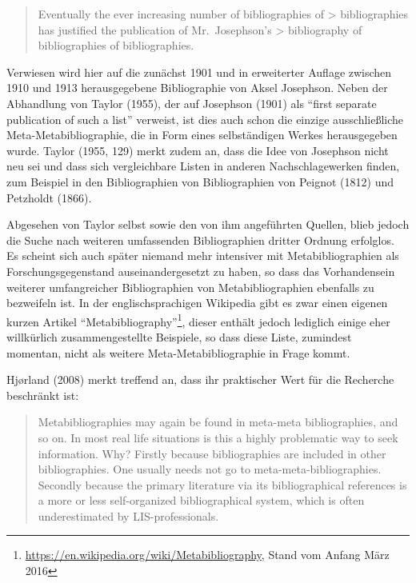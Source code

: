\documentclass[a4paper,
fontsize=11pt,
oneside,
numbers=noperiodatend,
parskip=half-,
bibliography=totoc,
final
]{scrartcl}
\begin{document}
\begin{quote}
Eventually the ever increasing number of bibliographies of
\textgreater{} bibliographies has justified the publication of
Mr.~Josephson's \textgreater{} bibliography of bibliographies of
bibliographies.
\end{quote}

Verwiesen wird hier auf die zunächst 1901 und in erweiterter Auflage
zwischen 1910 und 1913 herausgegebene Bibliographie von Aksel Josephson.
Neben der Abhandlung von Taylor (1955), der auf Josephson (1901) als
\enquote{first separate publication of such a list} verweist, ist dies
auch schon die einzige ausschließliche Meta-Metabibliographie, die in
Form eines selbständigen Werkes herausgegeben wurde. Taylor (1955, 129)
merkt zudem an, dass die Idee von Josephson nicht neu sei und dass sich
vergleichbare Listen in anderen Nachschlagewerken finden, zum Beispiel
in den Bibliographien von Bibliographien von Peignot (1812) und
Petzholdt (1866).

Abgesehen von Taylor selbst sowie den von ihm angeführten Quellen, blieb
jedoch die Suche nach weiteren umfassenden Bibliographien dritter
Ordnung erfolglos. Es scheint sich auch später niemand mehr intensiver
mit Metabibliographien als Forschungsgegenstand auseinandergesetzt zu
haben, so dass das Vorhandensein weiterer umfangreicher Bibliographien
von Metabibliographien ebenfalls zu bezweifeln ist. In der
englischsprachigen Wikipedia gibt es zwar einen eigenen kurzen Artikel
\enquote{Metabibliography}\footnote{\url{https://en.wikipedia.org/wiki/Metabibliography},
  Stand vom Anfang März 2016}, dieser enthält jedoch lediglich einige
eher willkürlich zusammengestellte Beispiele, so dass diese Liste,
zumindest momentan, nicht als weitere Meta-Metabibliographie in Frage
kommt.

Hjørland (2008) merkt treffend an, dass ihr praktischer Wert für die
Recherche beschränkt ist:

\begin{quote}
Metabibliographies may again be found in meta-meta bibliographies, and
so on. In most real life situations is this a highly problematic way to
seek information. Why? Firstly because bibliographies are included in
other bibliographies. One usually needs not go to
meta-meta-bibliographies. Secondly because the primary literature via
its bibliographical references is a more or less self-organized
bibliographical system, which is often underestimated by
LIS-professionals.
\end{quote}
\end{document}

